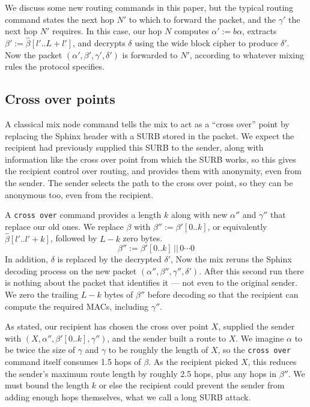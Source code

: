We discuss some new routing commands in this paper, but the typical
routing command states the next hop $N'$ to which to forward the
packet, and the $\gamma'$ the next hop $N'$ requires. 
In this case, our hop $N$ computes $\alpha' := b \alpha$,
extracts $\beta' := \hat\beta[l'..L+l']$, and
decrypts $\delta$ using the wide block cipher to produce $\delta'$.
Now the packet $(\alpha',\beta',\gamma',\delta')$ is forwarded to $N'$,
 according to whatever mixing rules the protocol specifies.


\subsection{Cross over points}\label{subsec:crossover}


A classical mix node command tells the mix to act as a ``cross over''
point by replacing the Sphinx header with a SURB stored in the packet.
We expect the recipient had previously supplied this SURB to the
sender, along with information like the cross over point from which
the SURB works, so this gives the recipient control over routing, 
and provides them with anonymity, even from the sender.  
The sender selects the path to the cross over point, so they can be
anonymous too, even from the recipient.

A {\tt cross over} command provides a length $k$ along with new
 $\alpha''$ and $\gamma''$ that replace our old ones. 
We replace $\beta$ with $\beta'' := \beta'[0..k]$, or equivalently
$\hat\beta[l'..l'+k]$, followed by $L-k$ zero bytes.
\[ \beta'' :=  \beta'[0..k] \,||\, 0\cdots0 \]
In addition, $\delta$ is replaced by the decrypted $\delta'$, 
Now the mix reruns the Sphinx decoding process on the new packet
$(\alpha'',\beta'',\gamma'',\delta')$. 
After this second run there is nothing about the packet that 
identifies it --- not even to the original sender.
We zero the trailing $L-k$ bytes of $\beta''$ before decoding so that
the recipient can compute the required MACs, including $\gamma''$.

As stated, our recipient has chosen the cross over point $X$,
supplied the sender with $(X,\alpha'',\beta'[0..k],\gamma'')$,
and the sender built a route to $X$.  We imagine $\alpha$ to be
twice the size of $\gamma$ and $\gamma$ to be roughly the length of
$X$, so the {\tt cross over} command itself consumes 1.5 hops of $\beta$.
As the recipient picked $X$, this reduces the sender's maximum route
length by roughly 2.5 hops, plus any hops in $\beta''$.
We must bound the length $k$ or else the recipient could prevent
the sender from adding enough hops themselves, what we call a
long SURB attack.

